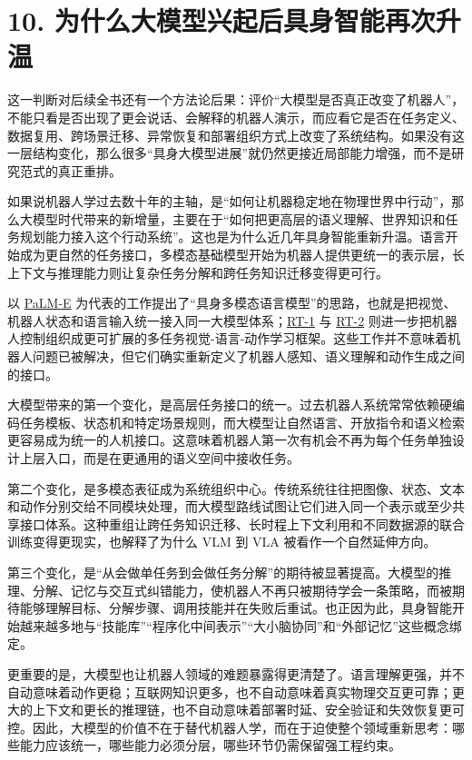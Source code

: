 \section*{10. 为什么大模型兴起后具身智能再次升温}

这一判断对后续全书还有一个方法论后果：评价“大模型是否真正改变了机器人”，不能只看是否出现了更会说话、会解释的机器人演示，而应看它是否在任务定义、数据复用、跨场景迁移、异常恢复和部署组织方式上改变了系统结构。如果没有这一层结构变化，那么很多“具身大模型进展”就仍然更接近局部能力增强，而不是研究范式的真正重排。

如果说机器人学过去数十年的主轴，是“如何让机器稳定地在物理世界中行动”，那么大模型时代带来的新增量，主要在于“如何把更高层的语义理解、世界知识和任务规划能力接入这个行动系统”。这也是为什么近几年具身智能重新升温。语言开始成为更自然的任务接口，多模态基础模型开始为机器人提供更统一的表示层，长上下文与推理能力则让复杂任务分解和跨任务知识迁移变得更可行。

以 \href{https://arxiv.org/abs/2303.03378}{PaLM-E} 为代表的工作提出了“具身多模态语言模型”的思路，也就是把视觉、机器人状态和语言输入统一接入同一大模型体系；\href{https://arxiv.org/abs/2212.06817}{RT-1} 与 \href{https://arxiv.org/abs/2307.15818}{RT-2} 则进一步把机器人控制组织成更可扩展的多任务视觉-语言-动作学习框架。这些工作并不意味着机器人问题已被解决，但它们确实重新定义了机器人感知、语义理解和动作生成之间的接口。

大模型带来的第一个变化，是高层任务接口的统一。过去机器人系统常常依赖硬编码任务模板、状态机和特定场景规则，而大模型让自然语言、开放指令和语义检索更容易成为统一的人机接口。这意味着机器人第一次有机会不再为每个任务单独设计上层入口，而是在更通用的语义空间中接收任务。

第二个变化，是多模态表征成为系统组织中心。传统系统往往把图像、状态、文本和动作分别交给不同模块处理，而大模型路线试图让它们进入同一个表示或至少共享接口体系。这种重组让跨任务知识迁移、长时程上下文利用和不同数据源的联合训练变得更现实，也解释了为什么 VLM 到 VLA 被看作一个自然延伸方向。

第三个变化，是“从会做单任务到会做任务分解”的期待被显著提高。大模型的推理、分解、记忆与交互式纠错能力，使机器人不再只被期待学会一条策略，而被期待能够理解目标、分解步骤、调用技能并在失败后重试。也正因为此，具身智能开始越来越多地与“技能库”“程序化中间表示”“大小脑协同”和“外部记忆”这些概念绑定。

更重要的是，大模型也让机器人领域的难题暴露得更清楚了。语言理解更强，并不自动意味着动作更稳；互联网知识更多，也不自动意味着真实物理交互更可靠；更大的上下文和更长的推理链，也不自动意味着部署时延、安全验证和失效恢复更可控。因此，大模型的价值不在于替代机器人学，而在于迫使整个领域重新思考：哪些能力应该统一，哪些能力必须分层，哪些环节仍需保留强工程约束。

